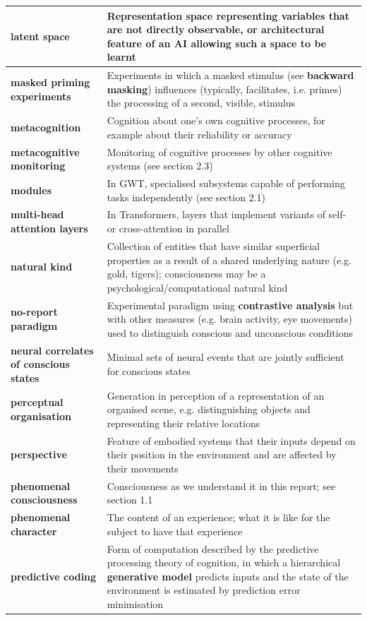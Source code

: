 \documentclass[12pt]{article}
\begin{document}
\begin{longtable}{|>{\raggedright\arraybackslash}p{}|>{\raggedright\arraybackslash}p{}|}
\hline
\textbf{latent space} & Representation space representing variables that are not directly observable, or architectural feature of an AI allowing such a space to be learnt \\
\hline
\textbf{masked priming experiments} & Experiments in which a masked stimulus (see \textbf{backward masking}) influences (typically, facilitates, i.e. primes) the processing of a second, visible, stimulus \\
\hline
\textbf{metacognition} & Cognition about one's own cognitive processes, for example about their reliability or accuracy \\
\hline
\textbf{metacognitive monitoring} & Monitoring of cognitive processes by other cognitive systems (see section 2.3) \\
\hline
\textbf{modules} & In GWT, specialised subsystems capable of performing tasks independently (see section 2.1) \\
\hline
\textbf{multi-head attention layers} & In Transformers, layers that implement variants of self- or cross-attention in parallel \\
\hline
\textbf{natural kind} & Collection of entities that have similar superficial properties as a result of a shared underlying nature (e.g. gold, tigers); consciousness may be a psychological/computational natural kind \\
\hline
\textbf{no-report paradigm} & Experimental paradigm using \textbf{contrastive analysis} but with other measures (e.g. brain activity, eye movements) used to distinguish conscious and unconscious conditions \\
\hline
\textbf{neural correlates of conscious states} & Minimal sets of neural events that are jointly sufficient for conscious states \\
\hline
\textbf{perceptual organisation} & Generation in perception of a representation of an organised scene, e.g. distinguishing objects and representing their relative locations \\
\hline
\textbf{perspective} & Feature of embodied systems that their inputs depend on their position in the environment and are affected by their movements \\
\hline
\textbf{phenomenal consciousness} & Consciousness as we understand it in this report; see section 1.1 \\
\hline
\textbf{phenomenal character} & The content of an experience; what it is like for the subject to have that experience \\
\hline
\textbf{predictive coding} & Form of computation described by the predictive processing theory of cognition, in which a hierarchical \textbf{generative model} predicts inputs and the state of the environment is estimated by prediction error minimisation \\

\end{longtable}
\end{document}
